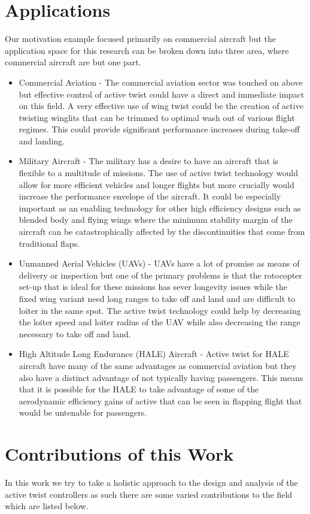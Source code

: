 \documentclass[11pt]{ucthesis}
\begin{document}
\section{Applications}
\label{sec:applications}
Our motivation example focused primarily on commercial aircraft but the application space for this research can be broken down into three area, where commercial aircraft are but one part.
\begin{itemize}
\item Commercial Aviation - The commercial aviation sector was touched on above but effective control of active twist could have a direct and immediate impact on this field. A very effective use of wing twist could be the creation of active twisting winglits that can be trimmed to optimal wash out of various flight regimes. This could provide significant performance increases during take-off and landing.
\item Military Aircraft - The military has a desire to have an aircraft that is flexible to a multitude of missions. The use of active twist technology would allow for more efficient vehicles and longer flights but more crucially would increase the performance envelope of the aircraft. It could be especially important as an enabling technology for other high efficiency designs such as blended body and flying wings where the minimum stability margin of the aircraft can be catastrophically affected by the discontinuities that come from traditional flaps.
\item Unmanned Aerial Vehicles (UAVs) - UAVs have a lot of promise as means of delivery or inspection but one of the primary problems is that the rotocopter set-up that is ideal for these missions has sever longevity issues while the fixed wing variant need long ranges to take off and land and are difficult to loiter in the same spot. The active twist technology could help by decreasing the loiter speed and loiter radius of the UAV while also decreasing the range necessary to take off and land.
\item High Altitude Long Endurance (HALE) Aircraft - Active twist for HALE aircraft have many of the same advantages as commercial aviation but they also have a distinct advantage of not typically having passengers. This means that it is possible for the HALE to take advantage of some of the aerodynamic efficiency gains of active that can be seen in flapping flight that would be untenable for passengers.
\end{itemize}

\section{Contributions of this Work}
In this work we try to take a holistic approach to the design and analysis of the active twist controllers as such there are some varied contributions to the field which are listed below.
\end{document}
